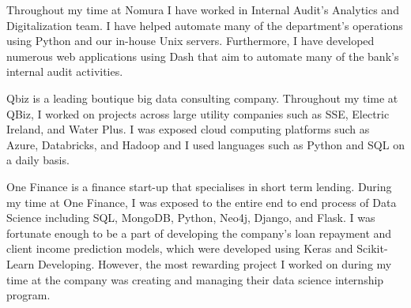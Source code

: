 \documentclass[10pt,a4paper]{altacv}
\begin{document}

\begin{fullwidth}
\makecvheader
\end{fullwidth}




Throughout my time at Nomura I have worked in Internal Audit's Analytics and Digitalization team. I have helped automate many of the department's operations using Python and our in-house Unix servers. Furthermore, I have developed numerous web applications using Dash that aim to automate many of the bank's internal audit activities. 

\divider

Qbiz is a leading boutique big data consulting company. Throughout my time at QBiz, I worked on projects across large utility companies such as SSE, Electric Ireland, and Water Plus. I was exposed cloud computing platforms such as Azure, Databricks, and Hadoop and I used languages such as Python and SQL on a daily basis. 

\divider

One Finance is a finance start-up that specialises in short term lending. During my time at One Finance, I was exposed to the entire end to end process of Data Science including SQL, MongoDB, Python, Neo4j, Django, and Flask. I was fortunate enough to be a part of developing the company's loan repayment and client income prediction models, which were developed using Keras and Scikit-Learn Developing. However, the most rewarding project I worked on during my time at the company was creating and managing their data science internship program.
\end{document}
